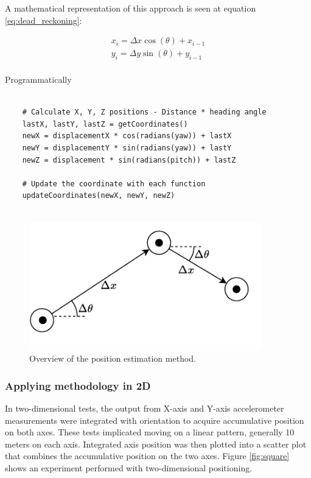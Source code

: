 A mathematical representation of this approach is seen at equation \ref{eq:dead_reckoning}:

\begin{equation}
    \begin{gathered}
        x_i = \Delta x \cos (\theta) + x_{i-1} \\
        y_i = \Delta y \sin (\theta) + y_{i-1} \\
    \end{gathered}
    \label{eq:dead_reckoning}
\end{equation}

Programmatically

\lstset{language=Python}
\begin{lstlisting}[frame=single]  % Start your code-block
    
    # Calculate X, Y, Z positions - Distance * heading angle
    lastX, lastY, lastZ = getCoordinates()
    newX = displacementX * cos(radians(yaw)) + lastX
    newY = displacementY * sin(radians(yaw)) + lastY
    newZ = displacement * sin(radians(pitch)) + lastZ 
    
    # Update the coordinate with each function
    updateCoordinates(newX, newY, newZ)
    
\end{lstlisting}

\begin{figure}[!h]
    \centering
    \includegraphics[width=0.9\textwidth]{figures/dead_reckoning.pdf}
    \caption{Overview of the position estimation method.}
    \label{fig:position}
\end{figure}

\subsubsection{Applying methodology in 2D}

In two-dimensional tests, the output from X-axis and Y-axis accelerometer measurements were integrated with orientation to acquire accumulative position on both axes. These tests implicated moving on a linear pattern, generally 10 meters on each axis. Integrated axis position was then plotted into a scatter plot that combines the accumulative position on the two axes. Figure \ref{fig:square} shows an experiment performed with two-dimensional positioning.

